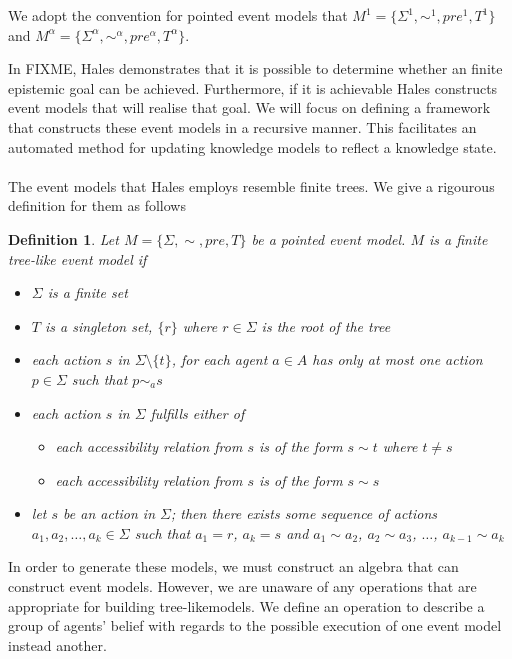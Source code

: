 \documentclass[12pt, a4paper, titlepage]{scrartcl}
\newtheorem{defn}{Definition}
\begin{document}
We adopt the convention for pointed event models that $M^1 = \{\Sigma^1, \sim^1,
pre^1, T^1\}$ and $M^\alpha = \{\Sigma^\alpha,\sim^\alpha,pre^\alpha,T^\alpha\}$.

In FIXME, Hales demonstrates that it is possible to determine whether an
finite epistemic goal can be achieved.
Furthermore, if it is achievable Hales constructs event models that will realise
that goal.
We will focus on defining a framework that constructs these event models in a
recursive manner.
This facilitates an automated method for updating knowledge models to reflect a
knowledge state.\\
\\
The event models that Hales employs resemble finite trees.
We give a rigourous definition for them as follows
\begin{defn} \label{finTree}
Let $M = \{\Sigma, \sim, pre, T \}$ be a pointed event model.
$M$ is a finite tree-like event model if
\begin{itemize}
	\item $\Sigma$ is a finite set
	\item $T$ is a singleton set, $\{ r \}$ where $r \in \Sigma$ is the root of the tree
	\item each action $s$ in $\Sigma \setminus \{ t \}$, for each agent $a \in A$ has only at most 
	one action $p \in \Sigma$ such that $p \sim_a s$
	\item each action $s$ in $\Sigma$ fulfills either of
	\begin{itemize}
		\item each accessibility relation from $s$ is of the form $s \sim t$ where $t \neq s$
		\item each accessibility relation from $s$ is of the form $s \sim s$
	\end{itemize}
	\item let $s$ be an action in $\Sigma$; then there exists some sequence of actions $a_1, a_2,
	\ldots, a_k \in \Sigma$ such that $a_1 = r$, $a_k = s$ and $a_1 \sim a_2$, $a_2 \sim a_3$,
	$\ldots$, $a_{k-1} \sim a_k$
\end{itemize}
\end{defn}

In order to generate these models, we must construct an algebra that can construct event models.
However, we are unaware of any operations that are appropriate for building tree-likemodels.
We define an operation to describe a group of agents' belief with regards to the possible execution
of one event model instead another.
\end{document}
